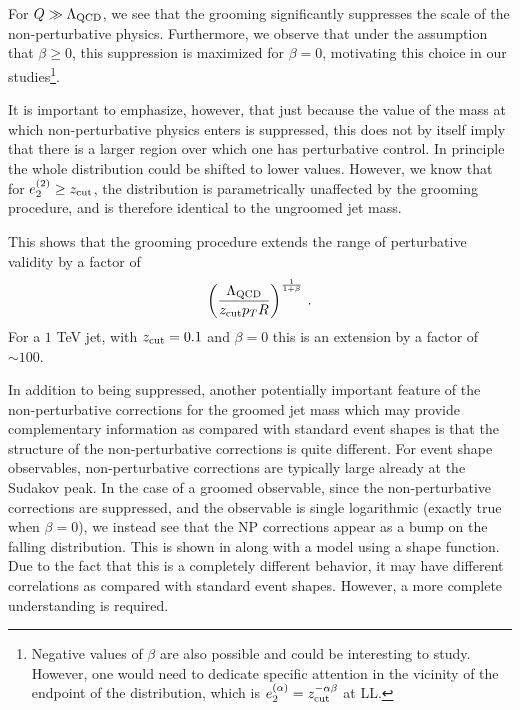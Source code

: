 \noindent For $Q\gg {\Lambda_\text{QCD}}$, we see that the grooming significantly suppresses
the scale of the non-perturbative physics. Furthermore, we observe
that under the assumption that $\beta \geq 0$, this suppression is
maximized for $\beta=0$, motivating this choice in our
studies\footnote{Negative values of $\beta$ are also possible and could be interesting to study.  However, one would need to dedicate specific attention in the vicinity of the endpoint of the distribution, which is $e_{2}^{(\alpha)}=z_\text{cut}^{-\alpha\beta}$ at LL.}. 

It is important to emphasize, however, that just because the value of the mass at which non-perturbative physics enters is suppressed, this does not by itself imply that there is a larger region over which one has perturbative control. In principle the whole distribution could be shifted to lower values. However, we know that for $e_{2}^{(2)} \geq z_{\rm cut}$, the distribution is parametrically unaffected by the grooming procedure, and is therefore identical to the ungroomed jet mass. 

This shows that the grooming procedure extends the range of perturbative validity by a factor of 
\begin{align}
\left( \frac{{\Lambda_\text{QCD}}}{z_{\rm cut} p_TR}  \right)^{\frac{1}{1+\beta}} \,.
\end{align}
For a $1$ TeV jet, with $z_{\rm cut} =0.1$ and $\beta=0$ this is an extension by a factor of $\sim 100$.


In addition to being suppressed, another potentially important feature of the non-perturbative corrections for the groomed jet mass which may provide complementary information as compared with standard event shapes is that the structure of the non-perturbative corrections is quite different. For event shape observables, non-perturbative corrections are typically large already at the Sudakov peak. In the case of a groomed observable, since the non-perturbative corrections are suppressed, and the observable is single logarithmic (exactly true when $\beta=0$), we instead see that the NP corrections appear as a bump on the falling distribution. This is shown in  along with a model using a shape function. Due to the fact that this is a completely different behavior, it may have different correlations as compared with standard event shapes. However, a more complete understanding is required. 


